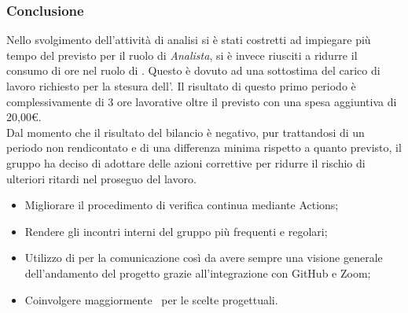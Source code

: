 \subsubsection{Conclusione}
Nello svolgimento dell'attività di analisi si è stati costretti ad impiegare più tempo del previsto per il ruolo di \textit{Analista}, si è invece riusciti a ridurre il consumo di ore nel ruolo di {\Amministratore}. Questo è dovuto ad una sottostima del carico di lavoro richiesto per la stesura dell'. Il risultato di questo primo periodo è complessivamente di 3 ore lavorative oltre il previsto con una spesa aggiuntiva di 20,00€.\\Dal momento che il risultato del bilancio è negativo, pur trattandosi di un periodo non rendicontato e di una differenza minima rispetto a quanto previsto, il gruppo {\Gruppo} ha deciso di adottare delle azioni correttive per ridurre il rischio di ulteriori ritardi nel proseguo del lavoro.
\begin{itemize}
	\item Migliorare il procedimento di verifica continua mediante  Actions;
	\item Rendere gli incontri interni del gruppo più frequenti e regolari;
	\item Utilizzo di  per la comunicazione così da avere sempre una visione generale dell'andamento del progetto grazie all'integrazione con GitHub e Zoom;
	\item Coinvolgere maggiormente \Proponente\ per le scelte progettuali.
\end{itemize}